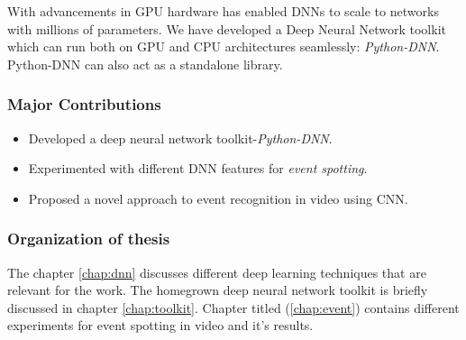 With advancements in GPU hardware has enabled DNNs to scale to networks with millions of parameters.  We have developed a Deep Neural Network toolkit which can run both on GPU and CPU architectures seamlessly: \textit{Python-DNN}.  Python-DNN can also act as a standalone library.

\subsubsection{Major Contributions}
\begin{itemize}
\item Developed a deep neural network toolkit-\textit{Python-DNN}. 
\item Experimented with different DNN features for \textit{event spotting}.
\item Proposed a novel approach to event recognition in video using CNN.
\end{itemize}

\subsubsection{Organization of thesis}
The chapter \ref{chap:dnn} discusses different deep learning techniques that are relevant for the work.  The homegrown deep neural network toolkit is briefly discussed in chapter \ref{chap:toolkit}.  Chapter titled  (\ref{chap:event}) contains different experiments for event spotting in video and it's results.
